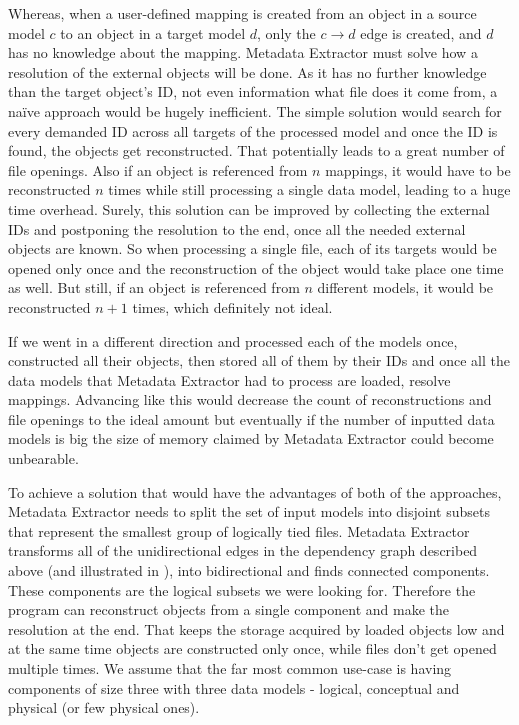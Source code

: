 Whereas, when a user-defined mapping is created from an object in a source model $c$ to an object in a target model $d$, only the $c \rightarrow d$ edge is created, and $d$ has no knowledge about the mapping.
Metadata Extractor must solve how a resolution of the external objects will be done. 
As it has no further knowledge than the target object's ID, not even information what file does it come from, a naïve approach would be hugely inefficient. 
The simple solution would search for every demanded ID across all targets of the processed model and once the ID is found, the objects get reconstructed. 
That potentially leads to a great number of file openings. Also if an object is referenced from $n$ mappings, it would have to be reconstructed $n$ times while still processing a single data model, leading to a huge time overhead.
Surely, this solution can be improved by collecting the external IDs and postponing the resolution to the end, once all the needed external objects are known. 
So when processing a single file, each of its targets would be opened only once and the reconstruction of the object would take place one time as well. But still, if an object is referenced from $n$ different models, it would be reconstructed $n + 1$ times, which definitely not ideal.

If we went in a different direction and processed each of the models once, constructed all their objects, then stored all of them by their IDs and once all the data models that Metadata Extractor had to process are loaded, resolve mappings. 
Advancing like this would decrease the count of reconstructions and file openings to the ideal amount but eventually if the number of inputted data models is big the size of memory claimed by Metadata Extractor could become unbearable.

To achieve a solution that would have the advantages of both of the approaches, Metadata Extractor needs to split the set of input models into disjoint subsets that represent the smallest group of logically tied files. 
Metadata Extractor transforms all of the unidirectional edges in the dependency graph described above (and illustrated in ), into bidirectional and finds connected components. These components are the logical subsets we were looking for. 
Therefore the program can reconstruct objects from a single component and make the resolution at the end. That keeps the storage acquired by loaded objects low and at the same time objects are constructed only once, while files don't get opened multiple times. 
We assume that the far most common use-case is having components of size three with three data models - logical, conceptual and physical (or few physical ones). \\

